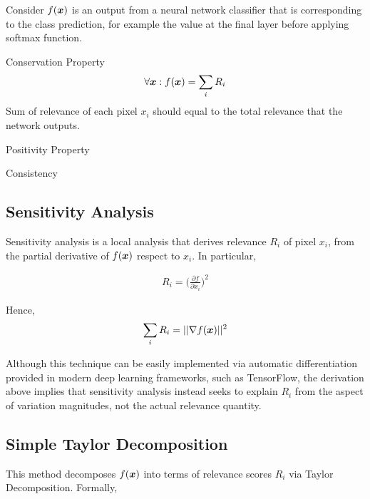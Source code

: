 Consider $f(\patvector{x})$ is an output from a neural network classifier that is corresponding to the class prediction, for example the value at the final layer before applying softmax function.
\begin{definition} Conservation Property
\begin{align*}
	\forall \patvector{x} : f(\patvector{x}) = \sum_i R_i
\end{align*}
Sum of relevance of each pixel $x_i$ should equal to the total relevance that the network outputs.

\end{definition}
\begin{definition} Positivity Property
\end{definition}
\begin{definition} Consistency
\end{definition}

\subsection{Sensitivity Analysis}
Sensitivity analysis is a local analysis that derives relevance $R_i$ of pixel $x_i$, from the partial derivative of $f(\patvector{x})$ respect to $x_i$. In particular, 

\begin{align*}
	R_i =
	 \bigg( \frac{\partial f}{ \partial x_i } \bigg)^2
\end{align*}

Hence, 
\begin{align*}
	\sum_i R_i = || \nabla f(\patvector{x}) ||^2
\end{align*}

Although this technique can be easily implemented via automatic differentiation provided in modern deep learning frameworks, such as TensorFlow\cite{AbadiTensorFlowLargeScaleMachine2016}, the derivation above implies that sensitivity analysis instead seeks to explain $R_i$ from the aspect of variation magnitudes, not the actual relevance quantity. 

\subsection{Simple Taylor Decomposition}
This method decomposes $f(\patvector{x})$ into terms of relevance scores $R_i$ via Taylor Decomposition. Formally, 

